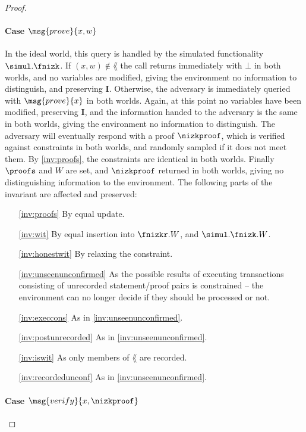 \begin{proof}
\paragraph{Case {\normalfont$\msg{prove}{x, w}$}}

In the ideal world, this query is handled by the simulated functionality
$\simul.\fnizk$. If $(x, w) \notin \lang$ the call returns immediately
with $\bot$ in both worlds, and no variables are modified, giving the
environment no information to distinguish, and preserving $\boldsymbol I$.
Otherwise, the adversary is immediately queried with $\msg{prove}{x}$ in both
worlds. Again, at this point no variables have been modified, preserving
$\boldsymbol I$, and the information handed to the adversary is the same in both
worlds, giving the environment no information to distinguish. The adversary will
eventually respond with a proof $\nizkproof$, which is verified against
constraints in both worlds, and randomly sampled if it does not meet them. By
\ref{inv:proofs}, the constraints are identical in both worlds. Finally $\proofs$
and $W$ are set, and $\nizkproof$ returned in both worlds, giving no
distinguishing information to the environment. The following parts of the
invariant are affected and preserved:

\begin{enumerate}
  \item[\ref{inv:proofs}] By equal update.
  \item[\ref{inv:wit}] By equal insertion into $\fnizkr.W$, and
    $\simul.\fnizk.W$.
  \item[\ref{inv:honestwit}] By relaxing the constraint.
  \item[\ref{inv:unseenunconfirmed}] As the possible results of executing
    transactions consisting of unrecorded statement/proof pairs is constrained
    -- the environment can no longer decide if they should be processed or not.
  \item[\ref{inv:execcons}] As in \ref{inv:unseenunconfirmed}.
  \item[\ref{inv:postunrecorded}] As in \ref{inv:unseenunconfirmed}.
  \item[\ref{inv:iswit}] As only members of $\lang$ are recorded.
  \item[\ref{inv:recordedunconf}] As in \ref{inv:unseenunconfirmed}.
\end{enumerate}

\paragraph{Case {\normalfont$\msg{verify}{x, \nizkproof}$}}


\end{proof}
